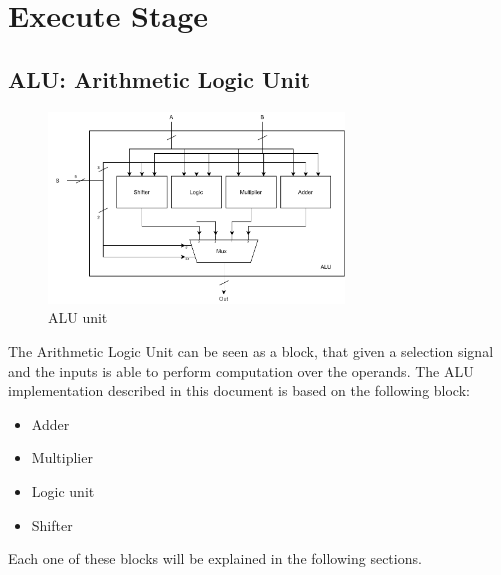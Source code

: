 \chapter{Execute Stage}

\section{ALU: Arithmetic Logic Unit}
\begin{figure}[h]
	\centering
	\includegraphics[width=0.7\textwidth]{chapters/5_ExecuteStage/images/ALU.pdf}
	\caption{ALU unit}
	\label{fig:ALU}
\end{figure}
The Arithmetic Logic Unit can be seen as a block, that given a selection signal and the inputs is able to perform computation over the operands. The ALU implementation described in this document is based on the following block:
\begin{itemize}
	\itemsep0sp
	\item Adder
	\item Multiplier
	\item Logic unit
	\item Shifter
\end{itemize}
Each one of these blocks will be explained in the following sections.


